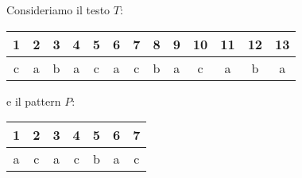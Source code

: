 \begin{esempio}
    Consideriamo il testo $T$:
    \begin{table}[!ht]
        \centering
        \begin{tabular}{ccccccccccccc}
            1                       & 2                      & 3
                                    & 4                      & 5
                                    & 6                      & 7
                                    & 8                      & 9
                                    & 10                     & 11
                                    & 12                     & 13 \\ \hline
            \multicolumn{1}{|c|}{c} & \multicolumn{1}{c|}{a} &
            \multicolumn{1}{c|}{b}  & \multicolumn{1}{c|}{a} &
            \multicolumn{1}{c|}{c}  & \multicolumn{1}{c|}{a} &
            \multicolumn{1}{c|}{c}  & \multicolumn{1}{c|}{b} &
            \multicolumn{1}{c|}{a}  & \multicolumn{1}{c|}{c} &
            \multicolumn{1}{c|}{a}  & \multicolumn{1}{c|}{b} &
            \multicolumn{1}{c|}{a}                                \\ \hline
        \end{tabular}
    \end{table}

    e il pattern $P$:
    \begin{table}[!ht]
        \centering
        \begin{tabular}{ccccccc}
            1                       & 2                      & 3
                                    & 4                      & 5
                                    & 6                      & 7 \\ \hline
            \multicolumn{1}{|c|}{a} & \multicolumn{1}{c|}{c} &
            \multicolumn{1}{c|}{a}  & \multicolumn{1}{c|}{c} &
            \multicolumn{1}{c|}{b}  & \multicolumn{1}{c|}{a} &
            \multicolumn{1}{c|}{c}                               \\ \hline
        \end{tabular}
    \end{table}


\end{esempio}

